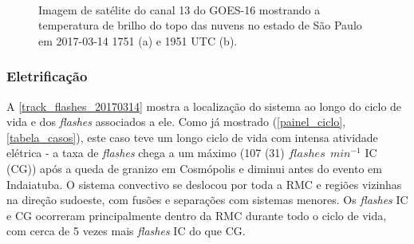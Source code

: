%
\begin{figure}[hp]
	\begin{center}
		\caption{Imagem de satélite do canal 13 do GOES-16 mostrando a temperatura de brilho do topo das nuvens no estado de São Paulo em 2017-03-14 1751 (a) e 1951 UTC (b).} 
		\label{goes16_sp_20170314}
		 \\
	\end{center}
\end{figure}

\subsubsection{Eletrificação}\label{elec_201703014}

A \autoref{track_flashes_20170314} mostra a localização do sistema ao longo do ciclo de vida e dos \textit{flashes} associados a ele. Como já mostrado (\autoref{painel_ciclo}, \autoref{tabela_casos}), este caso teve um longo ciclo de vida com intensa atividade elétrica - a taxa de \textit{flashes} chega a um máximo (107 (31) $flashes\:\:min^{-1}$ IC (CG)) após a queda de granizo em Cosmópolis e diminui antes do evento em Indaiatuba. O sistema convectivo se deslocou por toda a RMC e regiões vizinhas na direção sudoeste, com fusões e separações com sistemas menores. Os \textit{flashes} IC e CG ocorreram principalmente dentro da RMC durante todo o ciclo de vida, com cerca de 5 vezes mais \textit{flashes} IC do que CG.

